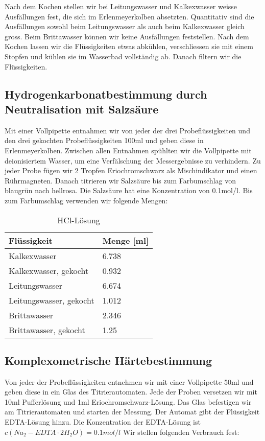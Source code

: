 \documentclass[10pt,oneside,a4paper,fleqn]{article}
\begin{document}
Nach dem Kochen stellen wir bei Leitungswasser und Kalkexwasser weisse
Ausfällungen fest, die sich im Erlenmeyerkolben absetzten. Quantitativ sind die
Ausfällungen sowohl beim Leitungswasser als auch beim Kalkexwasser gleich gross.
Beim Brittawasser können wir keine Ausfällungen feststellen.
Nach dem Kochen lassen wir die Flüssigkeiten etwas abkühlen, verschliessen
sie mit einem Stopfen und kühlen sie im Wasserbad vollständig ab. Danach filtern
wir die Flüssigkeiten.

\subsection{Hydrogenkarbonatbestimmung durch Neutralisation mit Salzsäure}
Mit einer Vollpipette entnahmen wir von jeder der drei Probeflüssigkeiten und
den drei gekochten Probeflüssigkeiten 100ml und geben diese in Erlenmeyerkolben.
Zwischen allen Entnahmen spühlten wir die Vollpipette mit deionisiertem Wasser, um eine Verfälschung der
Messergebnisse zu verhindern. Zu jeder Probe fügen wir 2 Tropfen
Eriochromschwarz als Mischindikator und einen Rührmagneten. Danach titrieren
wir Salzsäure bis zum Farbumschlag von blaugrün nach hellrosa. Die Salzsäure hat eine Konzentration
von 0.1mol/l. Bis zum Farbumschlag verwenden wir folgende Mengen:

\begin{table}[!h]
\caption{HCl-Lösung}
\label{tab:hcl}
\centering
	\begin{tabular}{|l|l|}
		\hline
		Flüssigkeit & Menge [ml] \\
		\hline
		Kalkexwasser & 6.738 \\
		\hline
		Kalkexwasser, gekocht & 0.932 \\
		\hline
		Leitungswasser &  6.674 \\
		\hline
		Leitungswasser, gekocht & 1.012 \\
		\hline
		Brittawasser & 2.346 \\
		\hline
		Brittawasser, gekocht & 1.25 \\
		\hline
	\end{tabular}
\end{table}

\subsection{Komplexometrische Härtebestimmung}
Von jeder der Probeflüssigkeiten entnehmen wir mit einer Vollpipette 50ml und
geben diese in ein Glas des Titrierautomaten. Jede der Proben versetzen wir mit
10ml Pufferlösung und 1ml Eriochromschwarz-Lösung. Das Glas befestigen wir am
Titrierautomaten und starten der Messung. Der Automat gibt der Flüssigkeit
EDTA-Lösung hinzu. Die Konzentration der EDTA-Lösung ist
$c(Na_2-EDTA\cdot2H_2O)=0.1mol/l$ Wir stellen folgenden Verbrauch fest:
\end{document}
